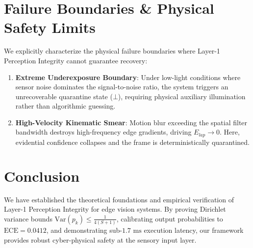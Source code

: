 \documentclass[conference]{IEEEtran}
\begin{document}
\section{Failure Boundaries \& Physical Safety Limits}
We explicitly characterize the physical failure boundaries where Layer-1 Perception Integrity cannot guarantee recovery:
\begin{enumerate}
    \item \textbf{Extreme Underexposure Boundary}: Under low-light conditions where sensor noise dominates the signal-to-noise ratio, the system triggers an unrecoverable quarantine state ($\bot$), requiring physical auxiliary illumination rather than algorithmic guessing.
    \item \textbf{High-Velocity Kinematic Smear}: Motion blur exceeding the spatial filter bandwidth destroys high-frequency edge gradients, driving $E_{lap} \to 0$. Here, evidential confidence collapses and the frame is deterministically quarantined.
\end{enumerate}

\section{Conclusion}
We have established the theoretical foundations and empirical verification of Layer-1 Perception Integrity for edge vision systems. By proving Dirichlet variance bounds $\mathrm{Var}(p_k) \le \frac{1}{4(S+1)}$, calibrating output probabilities to $\text{ECE} = 0.0412$, and demonstrating sub-$1.7\text{ ms}$ execution latency, our framework provides robust cyber-physical safety at the sensory input layer.
\end{document}
